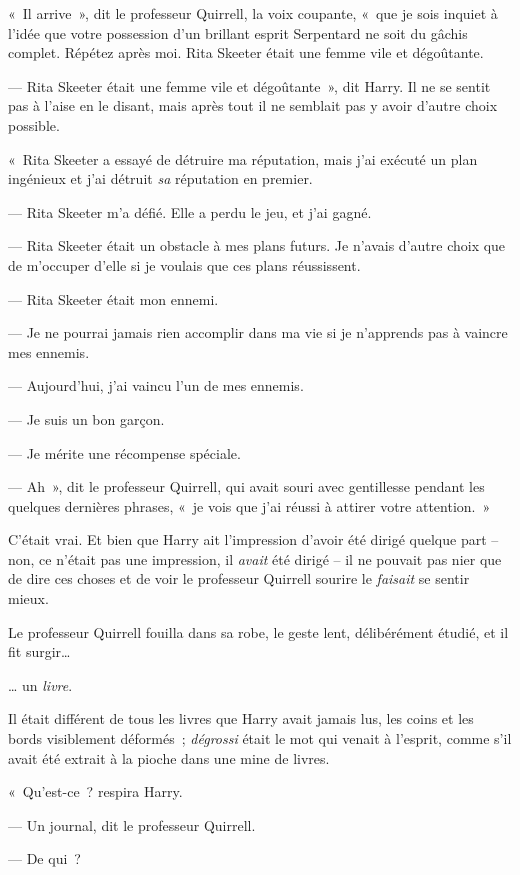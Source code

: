 «~Il arrive~», dit le professeur Quirrell, la voix coupante, «~que je sois inquiet à l'idée que votre possession d'un brillant esprit Serpentard ne soit du gâchis complet.
Répétez après moi.
Rita Skeeter était une femme vile et dégoûtante.

--- Rita Skeeter était une femme vile et dégoûtante~», dit Harry.
Il ne se sentit pas à l'aise en le disant, mais après tout il ne semblait pas y avoir d'autre choix possible.

«~Rita Skeeter a essayé de détruire ma réputation, mais j'ai exécuté un plan ingénieux et j'ai détruit \emph{sa} réputation en premier.

--- Rita Skeeter m'a défié.
Elle a perdu le jeu, et j'ai gagné.

--- Rita Skeeter était un obstacle à mes plans futurs.
Je n'avais d'autre choix que de m'occuper d'elle si je voulais que ces plans réussissent.

--- Rita Skeeter était mon ennemi.

--- Je ne pourrai jamais rien accomplir dans ma vie si je n'apprends pas à vaincre mes ennemis.

--- Aujourd'hui, j'ai vaincu l'un de mes ennemis.

--- Je suis un bon garçon.

--- Je mérite une récompense spéciale.

--- Ah~», dit le professeur Quirrell, qui avait souri avec gentillesse pendant les quelques dernières phrases, «~je vois que j'ai réussi à attirer votre attention.~»

C'était vrai.
Et bien que Harry ait l'impression d'avoir été dirigé quelque part -- non, ce n'était pas une impression, il \emph{avait} été dirigé -- il ne pouvait pas nier que de dire ces choses et de voir le professeur Quirrell sourire le \emph{faisait} se sentir mieux.

Le professeur Quirrell fouilla dans sa robe, le geste lent, délibérément étudié, et il fit surgir…

… un \emph{livre}.

Il était différent de tous les livres que Harry avait jamais lus, les coins et les bords visiblement déformés~; \emph{dégrossi} était le mot qui venait à l'esprit, comme s'il avait été extrait à la pioche dans une mine de livres.

«~Qu'est-ce~? respira Harry.

--- Un journal, dit le professeur Quirrell.

--- De qui~?

